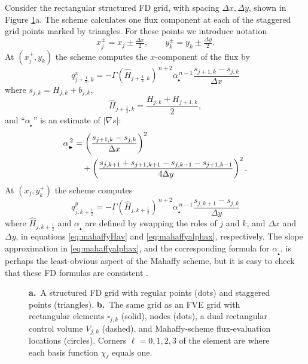 \documentclass[twocolumn,letterpaper]{igs}
\newcommand{\grad}{\nabla}
\newcommand\alpharight{\alpha_{{}_{\blacktriangleright}}}
\newcommand\alphaup{\alpha_{{\!}_{\blacktriangle}}}
\newcommand{\dxtwo}{\tfrac{\Delta x}{2}}
\newcommand{\dytwo}{\tfrac{\Delta y}{2}}
\newcommand{\half}{\tfrac{1}{2}}
\begin{document}
Consider the rectangular structured FD grid, with spacing $\Delta x,\Delta y$, shown in Figure \ref{fig:fdfemgrids}a.  The \cite{Mahaffy1976} scheme calculates one flux component at each of the staggered grid points marked by triangles.  For these points we introduce notation
\begin{equation}
x_j^\pm = x_j \pm \dxtwo, \qquad y_k^\pm = y_k \pm \dytwo. \label{eq:definexypm}
\end{equation}
At $(x_j^+,y_k)$ the scheme computes the $x$-component of the flux by
\begin{equation}
q^x_{j+\half,k} = - \Gamma (\hat H_{j+\half,k})^{\,n+2} \alpharight^{\,n-1} \frac{s_{j+1,k} - s_{j,k}}{\Delta x}  \label{eq:mahaffyqx}
\end{equation}
where $s_{j,k} = H_{j,k} + b_{j,k}$,
\begin{equation}
  \hat H_{j+\half,k} = \frac{H_{j,k} + H_{j+1,k}}{2},  \label{eq:mahaffyHav}
\end{equation}
and ``$\alpharight$\!'' is an estimate of $|\grad s|$:
\begin{align}
\alpharight^{\,2} &= \left(\frac{s_{j+1,k} - s_{j,k}}{\Delta x}\right)^2  \label{eq:mahaffyalphax} \\
  &\quad + \left(\frac{s_{j,k+1} + s_{j+1,k+1} - s_{j,k-1} - s_{j+1,k-1}}{4 \Delta y}\right)^2. \notag
\end{align}
At $(x_j,y_k^+)$ the scheme computes
\begin{equation}
q^y_{j,k+\half} = - \Gamma (\hat H_{j,k+\half})^{\,n+2} \alphaup^{\,n-1} \frac{s_{j,k+1} - s_{j,k}}{\Delta y}  \label{eq:mahaffyqy}
\end{equation}
where $\hat H_{j,k+\half}$ and $\alphaup$ are defined by swapping the roles of $j$ and $k$, and $\Delta x$ and $\Delta y$, in equations \eqref{eq:mahaffyHav} and \eqref{eq:mahaffyalphax}, respectively.  The slope approximation in \eqref{eq:mahaffyalphax}, and the corresponding formula for $\alphaup$, is perhaps the least-obvious aspect of the Mahaffy scheme, but it is easy to check that these FD formulas are consistent \citep{MortonMayers2005}.

\begin{figure}[ht]
\begin{center}
 \quad 
\end{center}
\caption{\textbf{a.}~A structured FD grid with regular points (dots) and staggered points (triangles).  \textbf{b.}~The same grid as an FVE grid with rectangular elements $\square_{j,k}$ (solid), nodes (dots), a dual rectangular control volume $V_{j,k}$ (dashed), and Mahaffy-scheme flux-evaluation locations (circles).  Corners $\ell=0,1,2,3$ of the element are where each basis function $\chi_\ell$ equals one.}
\label{fig:fdfemgrids}
\end{figure}
\end{document}
